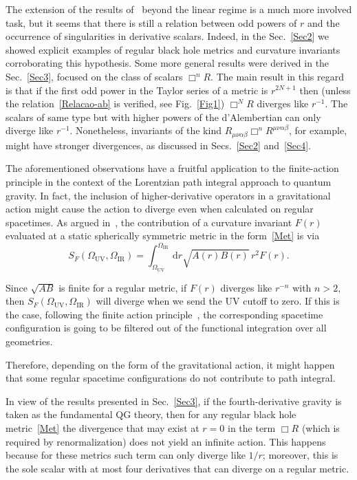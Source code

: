 \documentclass[aps,prd,a4paper,twocolumn,showpacs,showkeys,preprintnumbers,amsmath,amssymb,nofootinbib,usenames,dvipsnames]{revtex4-2}
\newcommand{\be}{\begin{eqnarray}}
\def\beq{\begin{equation}}
\def\eeq{\end{equation}}
\newcommand{\rd}{\mathrm{d}}  %
\def\al{\alpha}
\def\be{\beta}
\def\Om{\Omega}
\begin{document}
The extension of the results of~\cite{Nos6der} beyond the linear regime is a much more involved task, but it seems that there is still a relation between odd powers of $r$ and the occurrence of singularities in derivative scalars. Indeed, in the Sec.~\ref{Sec2} we showed explicit examples of regular black hole metrics and curvature invariants corroborating this hypothesis. Some more general results were derived in the Sec.~\ref{Sec3}, focused  on the class of scalars $\Box^n R$. The main result in this regard is that if the first odd power in the Taylor series of a metric is $r^{2N+1}$ then (unless the relation~\eqref{Relacao-ab} is verified, see Fig.~\ref{Fig1}) $\Box^N R$ diverges like $r^{-1}$. The scalars of same type but with higher powers of the d'Alembertian can only diverge like $r^{-1}$. Nonetheless, invariants of the kind $R_{\mu\nu\al\be} \Box^n R^{\mu\nu\al\be}$, for example, might have stronger divergences, as discussed in Secs.~\ref{Sec2} and~\ref{Sec4}.


The aforementioned observations have a fruitful application to 
the finite-action principle in the context of the Lorentzian path integral approach to quantum gravity. In fact,
the inclusion of higher-derivative operators in a gravitational action might cause the action to diverge even when calculated on regular spacetimes. As argued in~\cite{Borissova:2020knn}, the contribution of a curvature invariant $F(r)$ evaluated at a static spherically symmetric metric in the form~\eqref{Met} is via
%
\beq
\label{ultima}
S_F (\Om_{\text{UV}},\Om_{\text{IR}}) = \int_{\Om_{\text{UV}}}^{\Om_{\text{IR}}} \rd r \sqrt{A(r)B(r)}  \, r^2 F(r) .
\eeq
%
\vspace{0.1cm}

\noindent
Since $\sqrt{AB}$ is finite for a regular metric, if $F(r)$ diverges like $r^{-n}$ with $n > 2$, then $S_F (\Om_{\text{UV}},\Om_{\text{IR}})$ will diverge when we send the UV cutoff to zero. If this is the case, following the finite action principle~\cite{Lehners:2019ibe,BarrowTipler,Barrow:2019gzc,Borissova:2020knn},  the corresponding spacetime configuration is going to be filtered out of the functional integration over all geometries.

Therefore, depending on the form of the gravitational action, it might happen that some regular spacetime configurations do not contribute to path integral.

In view of the results presented in Sec.~\ref{Sec3}, if the fourth-derivative gravity is taken as the fundamental QG theory, then for any regular black hole metric~\eqref{Met} the divergence that may exist at $r=0$ in the term $\Box R$ (which is required by renormalization) does not yield an infinite action. This happens because for these metrics such term can only diverge like $1/r$; moreover, this is the sole scalar with at most four derivatives that can diverge on a regular metric.
\end{document}
